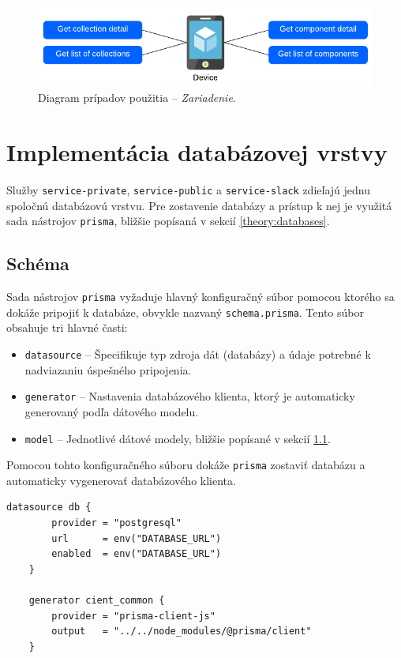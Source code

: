 \begin{figure}[h]
	\centering
	\includegraphics[scale=0.9]{obrazky-figures/device_use_case}
	\caption{Diagram prípadov použitia -- \emph{Zariadenie}.}
\end{figure}

\chapter{Implementácia databázovej vrstvy}
Služby \texttt{service-private}, \texttt{service-public} a \texttt{service-slack} zdieľajú jednu spoločnú databázovú vrstvu. Pre zostavenie databázy a prístup k nej je využitá sada nástrojov \texttt{prisma}, bližšie popísaná v sekcií \ref{theory:databases}.

\section{Schéma}
Sada nástrojov \texttt{prisma} vyžaduje hlavný konfiguračný súbor pomocou ktorého sa dokáže pripojiť k databáze, obvykle nazvaný \texttt{schema.prisma}. Tento súbor obsahuje tri hlavné časti:

\begin{itemize}
	\item \texttt{datasource} -- Špecifikuje typ zdroja dát (databázy) a údaje potrebné k nadviazaniu úspešného pripojenia.
	\item \texttt{generator} -- Nastavenia databázového klienta, ktorý je automaticky generovaný podľa dátového modelu.
	\item \texttt{model} -- Jednotlivé dátové modely, bližšie popísané v sekcií \ref{}.
\end{itemize}

\noindent Pomocou tohto konfiguračného súboru dokáže \texttt{prisma} zostaviť databázu a automaticky vygenerovať databázového klienta. \\

\begin{lstlisting}[label={impl:code:prisma_schema}, caption=Špecifikácia \texttt{datasource} a \texttt{generator} v konfiguračnom súbore \texttt{prisma}.]
	datasource db {
		provider = "postgresql"
		url      = env("DATABASE_URL")
		enabled  = env("DATABASE_URL")
	}

	generator cient_common {
		provider = "prisma-client-js"
		output   = "../../node_modules/@prisma/client"
	}
\end{lstlisting}

